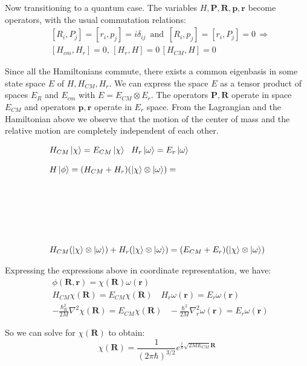 Now transitioning to a quantum case. The variables $ H, \mathbf{P}, \mathbf{R}, \mathbf{p}, \mathbf{r} $ become operators, with the usual commutation relations:
\begin{equation}
\begin{split}
& [R_i, P_j] = [r_i,p_j] = i\delta_{ij}\,\text{ and }\,[R_i, p_j] = [r_i,P_j] = 0 \,\Longrightarrow \\[.8em]
& [H_{cm},H_r] = 0,\,[H_r,H] = 0\,[H_{CM},H] = 0
\end{split}
\end{equation}

Since all the Hamiltonians commute, there exists a common eigenbasis in some state space $ E $ of $ H,H_{CM}, H_r $. We can express the space $ E $ as a tensor product of spaces $ E_R $ and $ E_{cm} $ with $ E = E_{CM} \otimes E_r $. The operators $ \mathbf{P}, \mathbf{R} $ operate in space $ E_{CM} $ and operators $ \mathbf{p}, \mathbf{r} $ operate in $ E_r $ space. From the Lagrangian and the Hamiltonian above we observe that the motion of the center of mass and the relative motion are completely independent of each other.

\begin{equation}
\begin{split}
& H_{CM}\Ket{\chi} = E_{CM}\Ket{\chi}\,\,\,\,H_{r}\Ket{\omega} = E_{r}\Ket{\omega}\\[.8em]
  & H\Ket{\phi} = (H_{CM} + H_{r})(\Ket{\chi} \otimes \Ket{\omega}) = \\[8.em]
&  H_{CM}(\Ket{\chi} \otimes \Ket{\omega}) + H_{r}(\Ket{\chi} \otimes \Ket{\omega}) = (E_{CM} + E_{r})(\Ket{\chi} \otimes \Ket{\omega})
\end{split}
\end{equation}

Expressing the expressions above in coordinate representation, we have:
\begin{equation}
\begin{split}
& \phi(\mathbf{R},\mathbf{r}) = \chi(\mathbf{R})\omega(\mathbf{r}) \\[.8em]
& H_{CM}\chi(\mathbf{R}) = E_{CM}\chi(\mathbf{R})\,\,\,\,\,\,H_r\omega(\mathbf{r}) = E_r\omega(\mathbf{r}) \\[.8em]
& -\frac{\hbar_R^2}{2M}\nabla^2\chi(\mathbf{R}) =  E_{CM}\chi(\mathbf{R})\,\,\,\,\,-\frac{\hbar^2}{2M}\nabla_r^2\omega(\mathbf{r}) =  E_{r}\omega(\mathbf{r})
\end{split}
\end{equation}

So we can solve for $ \chi(\mathbf{R}) $ to obtain:
\begin{equation}
\chi(\mathbf{R}) = \frac{1}{(2\pi\hbar)^{3/2}}e^{\frac{i}{\hbar}\sqrt{2ME_{CM}}\mathbf{R}}
\end{equation}


